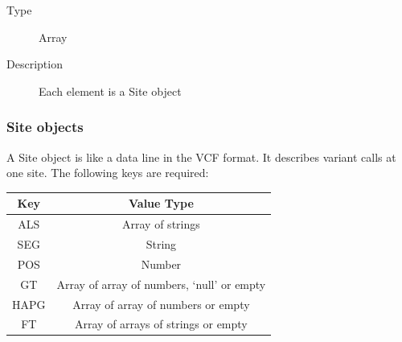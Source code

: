 \begin{description}
\item[Type]
Array
\item[Description]
Each element is a Site object
\end{description}

\hypertarget{site_obj}{%
\subsubsection{Site objects}\label{site_obj}}

A Site object is like a data line in the VCF format. It describes
variant calls at one site. The following keys are required:

\begin{longtable}[]{@{}cc@{}}
\toprule
\begin{minipage}[b]{0.16\columnwidth}\centering
Key\strut
\end{minipage} & \begin{minipage}[b]{0.64\columnwidth}\centering
Value Type\strut
\end{minipage}\tabularnewline
\midrule
\endhead
\begin{minipage}[t]{0.16\columnwidth}\centering
ALS\strut
\end{minipage} & \begin{minipage}[t]{0.64\columnwidth}\centering
Array of strings\strut
\end{minipage}\tabularnewline
\begin{minipage}[t]{0.16\columnwidth}\centering
SEG\strut
\end{minipage} & \begin{minipage}[t]{0.64\columnwidth}\centering
String\strut
\end{minipage}\tabularnewline
\begin{minipage}[t]{0.16\columnwidth}\centering
POS\strut
\end{minipage} & \begin{minipage}[t]{0.64\columnwidth}\centering
Number\strut
\end{minipage}\tabularnewline
\begin{minipage}[t]{0.16\columnwidth}\centering
GT\strut
\end{minipage} & \begin{minipage}[t]{0.64\columnwidth}\centering
Array of array of numbers, `null' or empty\strut
\end{minipage}\tabularnewline
\begin{minipage}[t]{0.16\columnwidth}\centering
HAPG\strut
\end{minipage} & \begin{minipage}[t]{0.64\columnwidth}\centering
Array of array of numbers or empty\strut
\end{minipage}\tabularnewline
\begin{minipage}[t]{0.16\columnwidth}\centering
FT\strut
\end{minipage} & \begin{minipage}[t]{0.64\columnwidth}\centering
Array of arrays of strings or empty\strut
\end{minipage}\tabularnewline
\bottomrule
\end{longtable}

